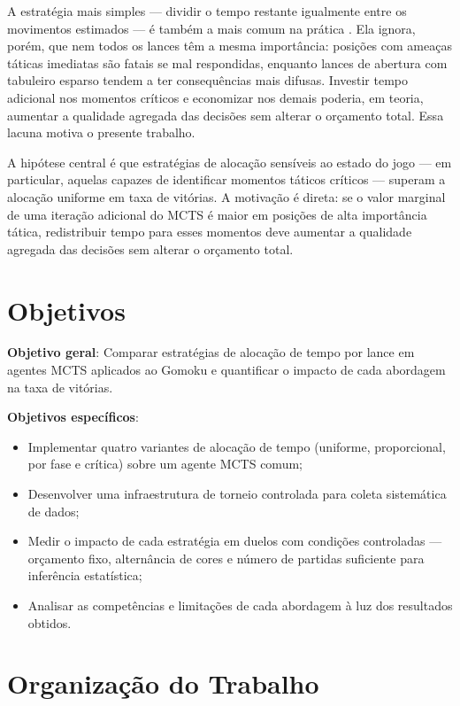 \documentclass[cic,tc]{iiufrgs}
\begin{document}
A estratégia mais simples — dividir o tempo restante igualmente entre os movimentos estimados — é também a mais comum na prática \cite{browne2012survey}. Ela ignora, porém, que nem todos os lances têm a mesma importância: posições com ameaças táticas imediatas são fatais se mal respondidas, enquanto lances de abertura com tabuleiro esparso tendem a ter consequências mais difusas. Investir tempo adicional nos momentos críticos e economizar nos demais poderia, em teoria, aumentar a qualidade agregada das decisões sem alterar o orçamento total. Essa lacuna motiva o presente trabalho.

A hipótese central é que estratégias de alocação sensíveis ao estado do jogo — em particular, aquelas capazes de identificar momentos táticos críticos — superam a alocação uniforme em taxa de vitórias. A motivação é direta: se o valor marginal de uma iteração adicional do MCTS é maior em posições de alta importância tática, redistribuir tempo para esses momentos deve aumentar a qualidade agregada das decisões sem alterar o orçamento total.

\section{Objetivos}
\label{sec:objectives}

\textbf{Objetivo geral}: Comparar estratégias de alocação de tempo por lance em agentes MCTS aplicados ao Gomoku e quantificar o impacto de cada abordagem na taxa de vitórias.

\textbf{Objetivos específicos}:

\begin{itemize}
    \item Implementar quatro variantes de alocação de tempo (uniforme, proporcional, por fase e crítica) sobre um agente MCTS comum;
    \item Desenvolver uma infraestrutura de torneio controlada para coleta sistemática de dados;
    \item Medir o impacto de cada estratégia em duelos com condições controladas — orçamento fixo, alternância de cores e número de partidas suficiente para inferência estatística;
    \item Analisar as competências e limitações de cada abordagem à luz dos resultados obtidos.
\end{itemize}

\section{Organização do Trabalho}
\label{sec:organization}
\end{document}
